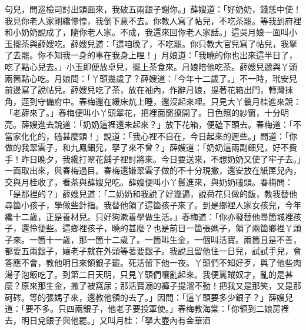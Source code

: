 \begin{showcontents}{}
句兒，問巡檢司討出頭面來，我破五兩銀子謝你。」薛嫂道：「好奶奶，錢恁中使！我見你老人家剛纔慘惶，我倒下意不去。你教人寫了帖兒，不吃茶罷。等我到府裡和小奶奶說成了，隨你老人家。不成，我還來回你老人家話。」這吳月娘一面叫小玉擺茶與薛嫂吃。薛嫂兒道：「這咱晚了，不吃罷。你只教大官兒寫了帖兒，我拏了去罷。你不知我一身的事在我身上哩！」月娘道：「我曉的你也出來這半日了，吃了點心兒去。」小玉即便放卓兒，擺上茶食來。月娘陪他吃茶。薛嫂兒遞與丫頭兩箇點心吃。月娘問：「丫頭幾歲了？薛嫂道：「今年十二歲了。」不一時，玳安兒前邊寫了說帖兒。薛嫂兒吃了茶，放在袖內，作辭月娘，提著花箱出門，轉灣抹角，逕到守備府中。春梅還在緩床炕上睡，還沒起來哩。只見大丫鬟月桂進來說：「老薛來了。」春梅便叫小丫頭翠花，把裡面窗撩開了。日色照的紗窗，十分明亮。薛嫂進去說道：「奶奶這裡還未起來？」放下花箱，便磕下頭去。春梅道：「不當家化化的，磕甚麼頭！」說道：「我心裡不自在，今日起來的遲些。」問道：「你做的我翠雲子，和九鳳鈿兒，拏了來不曾？」薛嫂道：「奶奶這兩副鈿兒，好不費手！昨日晚夕，我纔打翠花舖子裡討將來。今日要送來，不想奶奶又使了牢子去。」一面取出來，與春梅過目。春梅還嫌翠雲子做的不十分現撇，還安放在紙匣兒內，交與月桂收了，看茶與薛嫂兒吃。薛嫂便叫小丫鬟進來，與奶奶磕頭。春梅問：「是那裡的？」薛嫂兒道：「二奶奶和我說了好幾遍，說荷花只做的飯，教我替他尋箇小孩子，學做些針指。我替他領了這箇孩子來了。到是鄉裡人家女孩兒，今年纔十二歲，正是養材兒。只好狗漱着學做生活。」春梅道：「你亦發替他尋箇城裡孩子，還伶便些。這鄉裡孩子，曉的甚麼？也是前日一箇張媽子，領了兩箇鄉裡丫頭子來。一箇十一歲，那一箇十二歲了。一箇叫生金，一個叫活寶。兩箇且是不善，都要五兩銀子，孃老子就在外頭等著要銀子。我說且留他住一日兒，試試手兒，會答應不會，教他明日來領銀子罷。死活留下他一夜。丫頭們不知好歹，與了他些肉湯子泡飯吃了。到第二日天明，只見丫頭們嚷亂起來。我便罵賊奴才，亂的是甚麼？原來那生金，撒了被窩尿；那活寶溺的褲子提溜不動！把我又是那笑，又是那砢硶。等的張媽子來，還教他領的去了。」因問：「這丫頭要多少銀子？」薛嫂兒道：「要不多。只四兩銀子，他老子要投軍使。」春梅教海棠：「你領到二娘房裡去，明日兌銀子與他罷。」又叫月桂：「拏大壺內有金華酒 
\end{showcontents}
